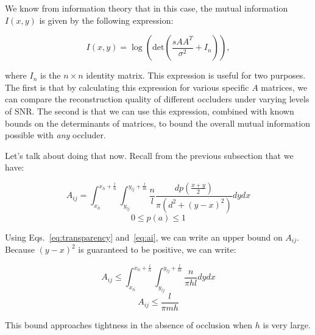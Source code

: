 \documentclass[11pt]{article}
\begin{document}
We know from information theory that in this case, the mutual information $I(x, y)$ is given by the following expression:

\begin{equation}
I(x, y) = \log(\mathrm{det}(\frac{sAA^T}{\sigma^2} + I_n)),
\end{equation}

where $I_n$ is the $n \times n$ identity matrix. This expression is useful for two purposes. The first is that by calculating this expression for various specific $A$ matrices, we can compare the reconstruction quality of different occluders under varying levels of SNR. The second is that we can use this expression, combined with known bounds on the determinants of matrices, to bound the overall mutual information possible with \emph{any} occluder.

Let's talk about doing that now. Recall from the previous subsection that we have:

\begin{equation}
    \label{eq:transparency}
A_{ij} = \int_{x_{li}}^{x_{li} + \frac{l}{n}} \int_{y_{lj}}^{y_{lj} + \frac{l}{m}} \frac{n}{l} \frac{d p(\frac{x+y}{2})}{\pi (d^2 + (y - x)^2)} dy dx
\end{equation}
\begin{equation}
    \label{eq:ai}
0 \le p(a) \le 1
\end{equation}

Using Eqs.~\ref{eq:transparency} and~\ref{eq:ai}, we can write an upper bound on $A_{ij}$. Because $(y-x)^2$ is guaranteed to be positive, we can write:

\begin{equation}
    A_{ij} \le \int_{x_{li}}^{x_{li} + \frac{l}{n}} \int_{y_{lj}}^{y_{lj} + \frac{l}{m}}\frac{n}{\pi h l} dy dx
\end{equation}
\begin{equation}
    A_{ij} \le \frac{l}{\pi m h}
\end{equation}

This bound approaches tightness in the absence of occlusion when $h$ is very large.

\end{document}
